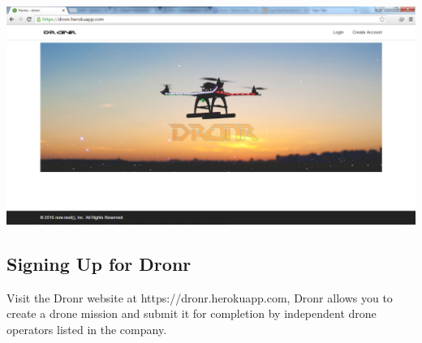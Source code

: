 \documentclass{article}
\begin{document}
		\includegraphics[width=1\textwidth]{./image/homepage.png}\\[0.4cm]
				
		\subsection{Signing Up for Dronr}
		
		
	
		Visit the Dronr website at   https://dronr.herokuapp.com,
		Dronr allows you to create a drone mission and submit it for completion by  independent drone operators listed in the company.
		
\end{document}
